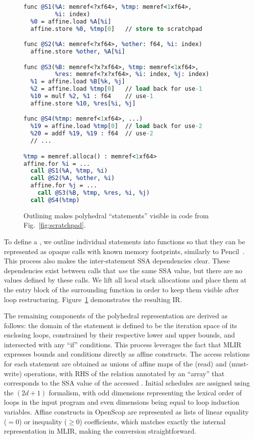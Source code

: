 \begin{figure}
{\scriptsize
\begin{lstlisting}[language=llvm, escapeinside=**, mathescape=true]
func @S1(%A: memref<?xf64>, %tmp: memref<1xf64>,
         %i: index)
  %0 = affine.load %A[%i]
  affine.store %0, %tmp[0]   // store to scratchpad

func @S2(%A: memref<?xf64>, %other: f64, %i: index)
  affine.store %other, %A[%i]

func @S3(%B: memref<?x?xf64>, %tmp: memref<1xf64>,
         %res: memref<?x?xf64>, %i: index, %j: index)
  %1 = affine.load %B[%k, %j]
  %2 = affine.load %tmp[0]   // load back for use-1
  %10 = mulf %2, %1 : f64    // use-1
  affine.store %10, %res[%i, %j]

func @S4(%tmp: memref<1xf64>, ...)
  %19 = affine.load %tmp[0]  // load back for use-2
  %20 = addf %19, %19 : f64  // use-2
  // ...

%tmp = memref.alloca() : memref<1xf64>
affine.for %i = ...
  call @S1(%A, %tmp, %i)
  call @S2(%A, %other, %i)
  affine.for %j = ...
    call @S3(%B, %tmp, %res, %i, %j)
  call @S4(%tmp)
\end{lstlisting}
}
\caption{Outlining makes polyhedral ``statements'' visible in code from Fig.~\ref{fig:scratchpad}.}
\label{fig:outlining}
\end{figure}


To define a \scop, we outline individual statements into functions so that they can be represented as opaque calls with known memory footprints, similarly to Pencil~\cite{pencil}.
This process also makes the inter-statement SSA dependencies clear. These dependencies exist between calls that \emph{use} the same SSA value, but there are no values defined by these calls. We lift all local stack allocations and place them at the entry block of the surrounding function in order to keep them visible after loop restructuring. Figure~\ref{fig:outlining} demonstrates the resulting IR.

The remaining components of the polyhedral representation are derived as follows:
the domain of the statement is defined to be the iteration space of its enclosing loops, constrained by their respective lower and upper bounds, and intersected with any ``if'' conditions. This process leverages the fact that MLIR expresses bounds and conditions directly as affine constructs.
The access relations for each statement are obtained as unions of affine maps of the  (read) and  (must-write) operations, with RHS of the relation annotated by an ``array'' that corresponds to the SSA value of the accessed \memref.
Initial schedules are assigned using the $(2d+1)$ formalism, with odd dimensions representing the lexical order of loops in the input program and even dimensions being equal to loop induction variables.
Affine constructs in OpenScop are represented as lists of linear equality ($=0$) or inequality ($\geq 0$) coefficients, which matches exactly the internal representation in MLIR, making the conversion straightforward.


